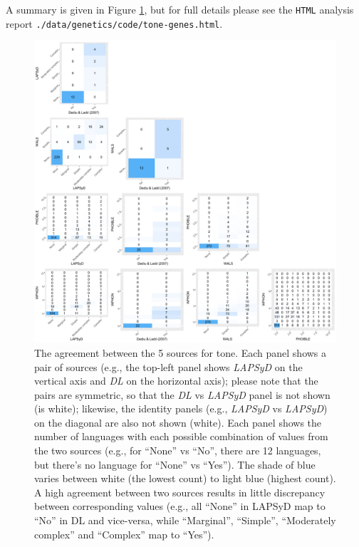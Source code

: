 \documentclass[twoside,twocolumn]{article}
\begin{document}
A summary is given in Figure \ref{Fig:tone_agreement_sources}, but for full details please see the \texttt{HTML} analysis report \verb|./data/genetics/code/tone-genes.html|.

\begin{figure}[h]
  \centering
  \includegraphics[width=\textwidth]{../../code/figures/tone_agreement_sources}
  \caption{The agreement between the 5 sources for tone. Each panel shows a pair of sources (e.g., the top-left panel shows \textit{LAPSyD} on the vertical axis and \textit{DL} on the horizontal axis); please note that the pairs are symmetric, so that the \textit{DL} vs \textit{LAPSyD} panel is not shown (is white); likewise, the identity panels (e.g., \textit{LAPSyD} vs \textit{LAPSyD}) on the diagonal are also not shown (white). Each panel shows the number of languages with each possible combination of values from the two sources (e.g., for ``None'' vs ``No'', there are 12 languages, but there's no language for ``None'' vs ``Yes''). The shade of blue varies between white (the lowest count) to light blue (highest count). A high agreement between two sources results in little discrepancy between corresponding values (e.g., all ``None'' in LAPSyD map to ``No'' in DL and vice-versa, while ``Marginal'', ``Simple'', ``Moderately complex'' and ``Complex'' map to ``Yes'').}
  \label{Fig:tone_agreement_sources}
\end{figure}
\end{document}
